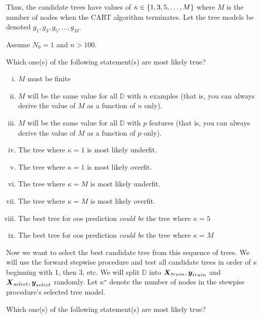 \documentclass[12pt]{article}
\begin{document}
Thus, the candidate trees have values of $\kappa \in \left\{1, 3, 5, \ldots, M\right\}$ where $M$ is the number of nodes when the CART algorithm terminates. Let the tree models be denoted $g_1, g_3, g_5, \ldots, g_M$.

Assume $N_0 = 1$ and $n > 100$.

\begin{enumerate}[(a)]
 Which one(s) of the following statement(s) are most likely true?

\begin{enumerate}[i)]
\item \iftoggle{solutions}{\inred{TRUE}}{} $M$ must be finite
\item $M$ will be the same value for all $\mathbb{D}$ with $n$ examples (that is, you can always derive the value of $M$ as a function of $n$ only).
\item $M$ will be the same value for all $\mathbb{D}$ with $p$ features (that is, you can always derive the value of $M$ as a function of $p$ only).
\item \iftoggle{solutions}{\inred{TRUE}}{} The tree where $\kappa = 1$ is most likely underfit.
\item The tree where $\kappa = 1$ is most likely overfit.
\item The tree where $\kappa = M$ is most likely underfit.
\item \iftoggle{solutions}{\inred{TRUE}}{} The tree where $\kappa = M$ is most likely overfit.
\item \iftoggle{solutions}{\inred{TRUE}}{} The best tree for oos prediction \textit{could be} the tree where $\kappa = 5$
\item The best tree for oos prediction \textit{could be} the tree where $\kappa = M$
\end{enumerate}
\pagebreak

Now we want to select the best candidate tree from this sequence of trees. We will use the forward stepwise procedure and test all candidate trees in order of $\kappa$ beginning with 1, then 3, etc. We will split $\mathbb{D}$ into $\boldsymbol{X}_{train}, \boldsymbol{y}_{train}$ and $\boldsymbol{X}_{select}, \boldsymbol{y}_{select}$ randomly. Let $\kappa^\star$ denote the number of nodes in the stewpise procedure's selected tree model.

 Which one(s) of the following statement(s) are most likely true?


\end{enumerate}
\end{document}
